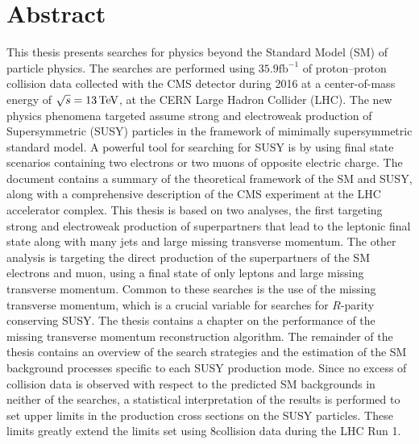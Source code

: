 \chapter*{Abstract}
\noindent\justify
This thesis presents searches for physics beyond the Standard Model (SM) of particle physics. 
The searches are performed using $35.9\mathrm{fb^{-1}}$ of proton--proton collision data collected with the CMS detector during 2016 at a center-of-mass energy of $\sqrt{s}=13\,\text{Te\hspace{-.08em}V}$, at the CERN Large Hadron Collider (LHC). 
The new physics phenomena targeted assume strong and electroweak production of Supersymmetric (SUSY) particles in the framework of mimimally supersymmetric standard model. 
A powerful tool for searching for SUSY is by using final state scenarios containing two electrons or two muons of opposite electric charge.  
\newpara
\noindent\justify
The document contains a summary of the theoretical framework of the SM and SUSY, along with a comprehensive description of the CMS experiment at the LHC accelerator complex. 
This thesis is based on two analyses, the first targeting strong and electroweak production of superpartners that lead to the leptonic final state along with many jets and large missing transverse momentum. 
The other analysis is targeting the direct production of the superpartners of the SM electrons and muon, using a final state of only leptons and large missing transverse momentum. 
Common to these searches is the use of the missing transverse momentum, which is a crucial variable for searches for $R$-parity conserving SUSY. 
The thesis contains a chapter on the performance of the missing transverse momentum reconstruction algorithm.  
The remainder of the thesis contains an overview of the search strategies and the estimation of the SM background processes specific to each SUSY production mode. 
\newpara
\noindent\justify
Since no excess of collision data is observed with respect to the predicted SM backgrounds in neither of the searches, a statistical interpretation of the results is performed to set upper limits in the production cross sections on the SUSY particles. 
These limits greatly extend the limits set using 8\TeV collision data during the LHC Run 1. 
